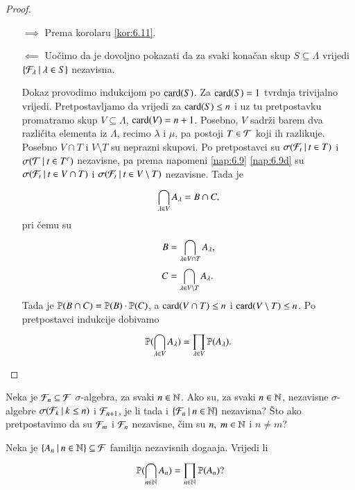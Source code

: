 \begin{proof}
    \begin{enumerate}
        \item[$\implies$] Prema korolaru \ref{kor:6.11}.
        \item[$\impliedby$] Uo\v cimo da je dovoljno pokazati da za svaki kona\v can skup $S \subseteq \Lambda$ vrijedi $\{{\mathcal{F}_\lambda} \: | \: {\lambda \in S}\}$ nezavisna.
        
        Dokaz provodimo indukcijom po $\textnormal{card}({S})$.
        Za $\textnormal{card}({S}) = 1$ tvrdnja trivijalno vrijedi.
        Pretpostavljamo da vrijedi za $\textnormal{card}({S}) \leq n$ i uz tu pretpostavku promatramo skup $V \subseteq \Lambda$, $\textnormal{card}({V}) = n + 1$.
        Posebno, $V$ sadr\v zi barem dva razli\v cita elementa iz $\Lambda$, recimo $\lambda$ i $\mu$, pa postoji $T \in \mathcal{T}$ koji ih razlikuje.
        Posebno $V \cap T$ i $V \setminus T$ su neprazni skupovi.
        Po pretpostavci su $\sigma({\mathcal{F}_t} \: | \: {t \in T})$ i $\sigma({\mathcal{T}} \: | \: {t \in T^c})$ nezavisne, pa prema napomeni \ref{nap:6.9}  \ref{nap:6.9d} su $\sigma({\mathcal{F}_t} \: | \: {t \in V \cap T})$ i $\sigma({\mathcal{F}_t} \: | \: {t \in V \setminus T})$ nezavisne.
        Tada je
        \begin{equation*}
            \bigcap\limits_{\lambda \in V}^{} A_\lambda = B \cap C,
        \end{equation*}
        pri \v cemu su
        \begin{equation*}
            \begin{aligned}
                B &= \bigcap\limits_{\lambda \in V \cap T}^{} A_\lambda,\\
                C &= \bigcap\limits_{\lambda \in V \setminus T}^{} A_\lambda.
            \end{aligned}
        \end{equation*}
        Tada je $\mathbb{P}({B \cap C}) = \mathbb{P}({B}) \cdot \mathbb{P}({C})$, a $\textnormal{card}({V \cap T}) \leq n$ i $\textnormal{card}({V \setminus T}) \leq n$.
        Po pretpostavci indukcije dobivamo
        \begin{equation*}
            \mathbb{P}({\bigcap\limits_{\lambda \in V}^{} A_\lambda}) = \prod\limits_{\lambda \in V}^{} \mathbb{P}({A_\lambda}).
        \end{equation*}
    \end{enumerate}
\end{proof}

\begin{zad} \label{zad:6.13}
    Neka je $\mathcal{F}_n \subseteq \mathcal{F}$ $\sigma$-algebra, za svaki $n \in \mathbb{N}$.
    Ako su, za svaki $n \in \mathbb{N}$, nezavisne $\sigma$-algebre $\sigma({\mathcal{F}_k} \: | \: {k \leq n})$ i $\mathcal{F}_{n + 1}$, je li tada i $\{{\mathcal{F}_n} \: | \: {n \in \mathbb{N}}\}$ nezavisna?
    \v Sto ako pretpostavimo da su $\mathcal{F}_m$ i $\mathcal{F}_n$ nezavisne, \v cim su $n, \; m \in \mathbb{N}$ i $n \neq m$?
\end{zad}

\begin{zad} \label{zad:6.14}
    Neka je $\{{A_n} \: | \: {n \in \mathbb{N}}\} \subseteq \mathcal{F}$ familija nezavisnih doga\dj aja.
    Vrijedi li
    \begin{equation*}
        \mathbb{P}({\bigcap\limits_{n \in \mathbb{N}}^{} A_n}) = \prod\limits_{n \in \mathbb{N}}^{} \mathbb{P}({A_n})?
    \end{equation*}
\end{zad}